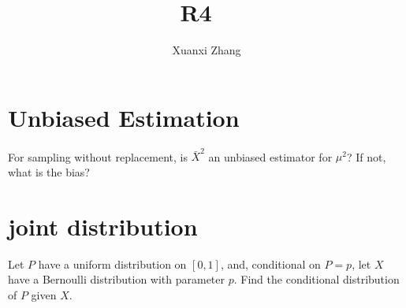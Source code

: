 \documentclass{article}%
\title{\huge R4 \ \normalsize}
\author{Xuanxi Zhang}
\newif\ifwithrefs
\begin{document}
\maketitle
\section{Unbiased Estimation}
For sampling without replacement, is $\bar{X}^2$ an unbiased estimator for $\mu^2$? If not, what is the bias?

\section{joint distribution} Let $P$ have a uniform distribution on $[0,1]$, and, conditional on $P=p$, let $X$ have a Bernoulli distribution with parameter $p$. Find the conditional distribution of $P$ given $X$.



\ifwithrefs
  
\fi
\end{document}

